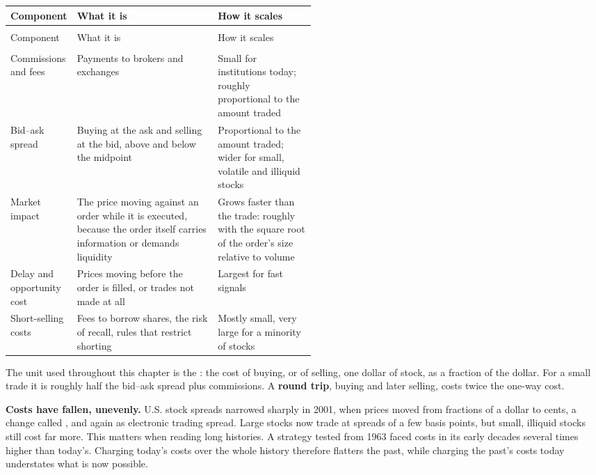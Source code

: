 \begingroup
\small
\setlength{\LTpre}{6pt}\setlength{\LTpost}{6pt}
\begin{longtable}{@{}>{\raggedright\arraybackslash}p{0.19\linewidth}>{\raggedright\arraybackslash}p{}>{\raggedright\arraybackslash}p{0.32\linewidth}@{}}
\toprule
Component & What it is & How it scales \\
\midrule
\endfirsthead
\multicolumn{3}{@{}l}{\emph{(continued)}} \\
\toprule
Component & What it is & How it scales \\
\midrule
\endhead
\midrule
\multicolumn{3}{r@{}}{\emph{(continued on the next page)}} \\
\endfoot
\bottomrule
\endlastfoot
Commissions and fees & Payments to brokers and exchanges & Small for institutions today; roughly proportional to the amount traded \\*
Bid--ask spread & Buying at the ask and selling at the bid, above and below the midpoint & Proportional to the amount traded; wider for small, volatile and illiquid stocks \\
Market impact & The price moving against an order while it is executed, because the order itself carries information or demands liquidity & Grows faster than the trade: roughly with the square root of the order's size relative to volume \\
Delay and opportunity cost & Prices moving before the order is filled, or trades not made at all & Largest for fast signals \\*
Short-selling costs & Fees to borrow shares, the risk of recall, rules that restrict shorting & Mostly small, very large for a minority of stocks \\
\end{longtable}
\addtocounter{table}{-1}%
\endgroup

The unit used throughout this chapter is the : the cost of buying, or of selling, one dollar of stock, as a fraction of the dollar. For a small trade it is roughly half the bid--ask spread plus commissions. A \textbf{round trip}, buying and later selling, costs twice the one-way cost.

\textbf{Costs have fallen, unevenly.} U.S. stock spreads narrowed sharply in 2001, when prices moved from fractions of a dollar to cents, a change called , and again as electronic trading spread. Large stocks now trade at spreads of a few basis points, but small, illiquid stocks still cost far more. This matters when reading long histories. A strategy tested from 1963 faced costs in its early decades several times higher than today's. Charging today's costs over the whole history therefore flatters the past, while charging the past's costs today understates what is now possible.

